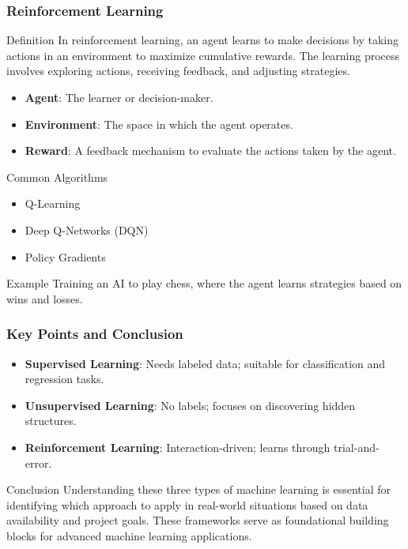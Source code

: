 \documentclass[aspectratio=169]{beamer}
\begin{document}
\begin{frame}[fragile]
    \frametitle{Reinforcement Learning}
    \begin{block}{Definition}
        In reinforcement learning, an agent learns to make decisions by taking actions in an environment to maximize cumulative rewards. The learning process involves exploring actions, receiving feedback, and adjusting strategies.
    \end{block}
    \begin{itemize}
        \item \textbf{Agent}: The learner or decision-maker.
        \item \textbf{Environment}: The space in which the agent operates.
        \item \textbf{Reward}: A feedback mechanism to evaluate the actions taken by the agent.
    \end{itemize}
    \begin{block}{Common Algorithms}
        \begin{itemize}
            \item Q-Learning
            \item Deep Q-Networks (DQN)
            \item Policy Gradients
        \end{itemize}
    \end{block}
    \begin{block}{Example}
        Training an AI to play chess, where the agent learns strategies based on wins and losses.
    \end{block}
\end{frame}

\begin{frame}[fragile]
    \frametitle{Key Points and Conclusion}
    \begin{itemize}
        \item \textbf{Supervised Learning}: Needs labeled data; suitable for classification and regression tasks.
        \item \textbf{Unsupervised Learning}: No labels; focuses on discovering hidden structures.
        \item \textbf{Reinforcement Learning}: Interaction-driven; learns through trial-and-error.
    \end{itemize}
    \begin{block}{Conclusion}
        Understanding these three types of machine learning is essential for identifying which approach to apply in real-world situations based on data availability and project goals. These frameworks serve as foundational building blocks for advanced machine learning applications.
    \end{block}
\end{frame}
\end{document}
